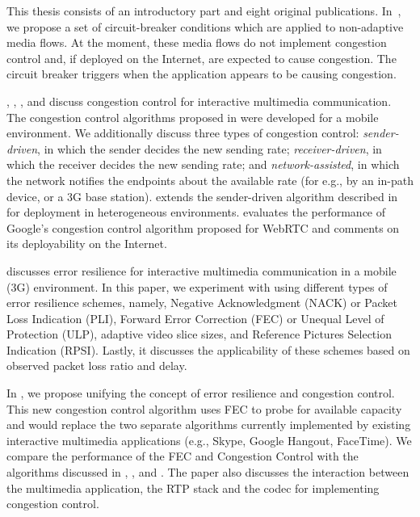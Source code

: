 This thesis consists of an introductory part and eight original publications.
In~, we propose a set of circuit-breaker conditions which are
applied to non-adaptive media flows. At the moment, these media flows do not
implement congestion control and, if deployed on the Internet, are expected to
cause congestion. The circuit breaker triggers when the application appears to
be causing congestion.

, , , and 
discuss congestion control for interactive multimedia communication. The
congestion control algorithms proposed in  were developed for
a mobile environment. We additionally discuss three types of congestion
control:  \emph{sender-driven}, in which the sender decides the new sending rate; 
\emph{receiver-driven}, in which the receiver decides the new sending rate; and 
\emph{network-assisted}, in which the network notifies the endpoints about the available
rate (for e.g., by an in-path device, or a 3G base station). 
extends the sender-driven algorithm described in  for
deployment in heterogeneous environments.  evaluates the
performance of Google's congestion control algorithm proposed for WebRTC and
comments on its deployability on the Internet.

 discusses error resilience for interactive multimedia
communication in a mobile (3G) environment. In this paper, we experiment with
using different types of error resilience schemes, namely, Negative
Acknowledgment (NACK) or Packet Loss Indication (PLI), Forward Error
Correction (FEC) or Unequal Level of Protection (ULP), adaptive video slice
sizes, and Reference Pictures Selection Indication (RPSI). Lastly, it
discusses the applicability of these schemes based on observed packet loss
ratio and delay.

In , we propose unifying the concept of error resilience and
congestion control. This new congestion control algorithm uses FEC to probe
for available capacity and would replace the two separate algorithms currently
implemented by existing interactive multimedia applications (e.g., Skype,
Google Hangout, FaceTime). We compare the performance of the FEC and
Congestion Control with the algorithms discussed in ,
, and . The paper also discusses the
interaction between the multimedia application, the RTP stack and the codec
for implementing congestion control.


